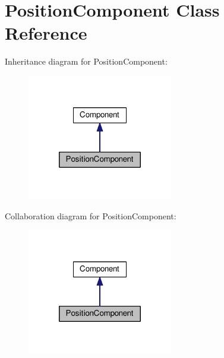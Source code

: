 \hypertarget{classPositionComponent}{\section{Position\-Component Class Reference}
\label{classPositionComponent}
}


Inheritance diagram for Position\-Component\-:
\nopagebreak
\begin{figure}[H]
\begin{center}
\leavevmode
\includegraphics[width=180pt]{classPositionComponent__inherit__graph}
\end{center}
\end{figure}


Collaboration diagram for Position\-Component\-:
\nopagebreak
\begin{figure}[H]
\begin{center}
\leavevmode
\includegraphics[width=180pt]{classPositionComponent__coll__graph}
\end{center}
\end{figure}
